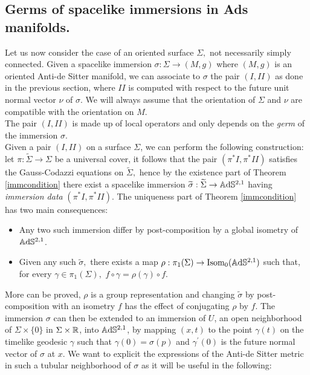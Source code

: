 \subsection{Germs of spacelike immersions in Ads manifolds.}

Let us now consider the case of an oriented surface $\Sigma,$ not necessarily simply connected. Given a spacelike immersion $\sigma:\Sigma\to(M,g)$ where $(M,g)$ is an oriented Anti-de Sitter manifold, we can associate to $\sigma$ the pair $(I,II)$ as done in the previous section, where $II$ is computed with respect to the future unit normal vector $\nu$ of $\sigma$. We will always assume that the orientation of $\Sigma$ and $\nu$ are compatible with the orientation on $M.$\\
The pair $(I, II)$ is made up of local operators and only depends on the \textit{germ} of the immersion $\sigma.$\\
Given a pair $(I,II)$ on a surface $\Sigma$, we can perform the following construction: let $\pi:\widetilde{\Sigma}\to\Sigma$ be a universal cover, it follows that the pair $(\pi^*I,\pi^*II)$ satisfies the Gauss-Codazzi equations on $\widetilde{\Sigma},$ hence by the existence part of Theorem \ref{immcondition} there exist a spacelike immersion $\widetilde{\sigma}:\widetilde{\Sigma}\to\mathbb{A}\mathrm{d}\mathbb{S}^{2,1}$ having \textit{immersion data} $(\pi^*I,\pi^*II)$. The uniqueness part of Theorem \ref{immcondition} has two main consequences: 

\begin{itemize}
    \item Any two such immersion differ by post-composition by a global isometry of $\mathbb{A}\mathrm{d}\mathbb{S}^{2,1}$. 
    \item Given any such $\widetilde{\sigma},$ there exists a map $\rho:\pi_1(\Sigma)\to\text{Isom}_0(\mathbb{A}\mathrm{d}\mathbb{S}^{2,1})$ such that, for every $\gamma\in\pi_1(\Sigma),$ $f\circ\gamma=\rho(\gamma)\circ f$. 
\end{itemize}

More can be proved, $\rho$ is a group representation and changing $\widetilde{\sigma}$ by post-composition with an isometry $f$ has the effect of conjugating $\rho$ by $f$. The immersion $\sigma$ can then be extended to an immersion of $U$, an open neighborhood of $\Sigma\times\{0\}$ in $\Sigma\times\mathbb{R}$, into $\mathbb{A}\mathrm{d}\mathbb{S}^{2,1}$, by mapping $(x,t)$ to the point $\gamma(t)$ on the timelike geodesic $\gamma$ such that $\gamma(0)=\sigma(p)$ and $\gamma^{\prime}(0)$ is the future normal vector of $\sigma$ at $x$. We want to explicit the expressions of the Anti-de Sitter metric in such a tubular neighborhood of $\sigma$ as it will be useful in the following: 

